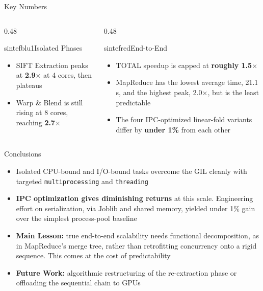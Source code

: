 \documentclass{beamer}
\begin{document}
\begin{frame}{Key Numbers}
  \begin{columns}
    \begin{column}{0.48\textwidth}
      \begin{colorblock}[white]{sintefblu1}{Isolated Phases}
        \begin{itemize}
          \item SIFT Extraction peaks at \textbf{2.9$\times$} at 4 cores, then plateaus
          \item Warp \& Blend is still rising at 8 cores, reaching \textbf{2.7$\times$}
        \end{itemize}
      \end{colorblock}
    \end{column}
    \begin{column}{0.48\textwidth}
      \begin{colorblock}[white]{sintefred}{End-to-End}
        \begin{itemize}
          \item TOTAL speedup is capped at \textbf{roughly 1.5$\times$}
          \item MapReduce has the lowest average time, 21.1\,s, and the highest peak, 2.0$\times$, but is the least predictable
          \item The four IPC-optimized linear-fold variants differ by \textbf{under 1\%} from each other
        \end{itemize}
      \end{colorblock}
    \end{column}
  \end{columns}
\end{frame}

\begin{frame}{Conclusions}
  \begin{itemize}
    \item Isolated CPU-bound and I/O-bound tasks overcome the GIL cleanly with targeted \texttt{multiprocessing} and \texttt{threading} %
    \item \textbf{IPC optimization gives diminishing returns} at this scale. Engineering effort on serialization, via Joblib and shared memory, yielded under 1\% gain over the simplest process-pool baseline
    \item \textbf{Main Lesson:} true end-to-end scalability needs functional decomposition, as in MapReduce's merge tree, rather than retrofitting concurrency onto a rigid sequence. This comes at the cost of predictability
    \item \textbf{Future Work:} algorithmic restructuring of the re-extraction phase or offloading the sequential chain to GPUs
  \end{itemize}
\end{frame}
\end{document}
